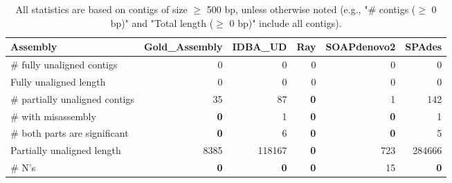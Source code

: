 \documentclass[12pt,a4paper]{article}
\begin{document}
\begin{table}[ht]
\begin{center}
\caption{All statistics are based on contigs of size $\geq$ 500 bp, unless otherwise noted (e.g., "\# contigs ($\geq$ 0 bp)" and "Total length ($\geq$ 0 bp)" include all contigs).}
\begin{tabular}{|l*{5}{|r}|}
\hline
Assembly & Gold\_Assembly & IDBA\_UD & Ray & SOAPdenovo2 & SPAdes \\ \hline
\# fully unaligned contigs & 0 & 0 & 0 & 0 & 0 \\ \hline
Fully unaligned length & 0 & 0 & 0 & 0 & 0 \\ \hline
\# partially unaligned contigs & 35 & 87 & {\bf 0} & 1 & 142 \\ \hline
\hspace{5mm}\# with misassembly & {\bf 0} & 1 & {\bf 0} & {\bf 0} & 1 \\ \hline
\hspace{5mm}\# both parts are significant & {\bf 0} & 6 & {\bf 0} & {\bf 0} & 5 \\ \hline
Partially unaligned length & 8385 & 118167 & {\bf 0} & 723 & 284666 \\ \hline
\# N's & {\bf 0} & {\bf 0} & {\bf 0} & 15 & {\bf 0} \\ \hline
\end{tabular}
\end{center}
\end{table}
\end{document}
